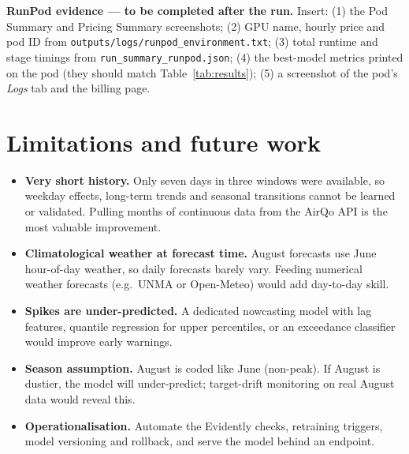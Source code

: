 \documentclass[11pt,a4paper]{article}
\begin{document}
\begin{todobox}
\textbf{RunPod evidence --- to be completed after the run.} Insert: (1) the Pod Summary and Pricing Summary screenshots; (2) GPU name, hourly price and pod ID from \texttt{outputs/logs/runpod\_environment.txt}; (3) total runtime and stage timings from \texttt{run\_summary\_runpod.json}; (4) the best-model metrics printed on the pod (they should match Table~\ref{tab:results}); (5) a screenshot of the pod's \emph{Logs} tab and the billing page.
\end{todobox}

\section{Limitations and future work}
\begin{itemize}
\item \textbf{Very short history.} Only seven days in three windows were available, so weekday effects, long-term trends and seasonal transitions cannot be learned or validated. Pulling months of continuous data from the AirQo API is the most valuable improvement.
\item \textbf{Climatological weather at forecast time.} August forecasts use June hour-of-day weather, so daily forecasts barely vary. Feeding numerical weather forecasts (e.g.\ UNMA or Open-Meteo) would add day-to-day skill.
\item \textbf{Spikes are under-predicted.} A dedicated nowcasting model with lag features, quantile regression for upper percentiles, or an exceedance classifier would improve early warnings.
\item \textbf{Season assumption.} August is coded like June (non-peak). If August is dustier, the model will under-predict; target-drift monitoring on real August data would reveal this.
\item \textbf{Operationalisation.} Automate the Evidently checks, retraining triggers, model versioning and rollback, and serve the model behind an endpoint.
\end{itemize}

\end{document}
